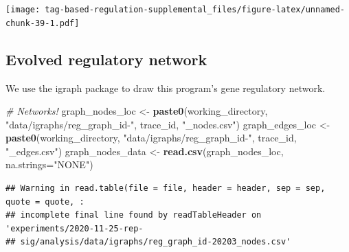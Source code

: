 \documentclass[]{book}
\newenvironment{Shaded}{\begin{snugshade}}{\end{snugshade}}
\newcommand{\CommentTok}[1]{\textcolor[rgb]{0.56,0.35,0.01}{\textit{#1}}}
\newcommand{\DataTypeTok}[1]{\textcolor[rgb]{0.13,0.29,0.53}{#1}}
\newcommand{\KeywordTok}[1]{\textcolor[rgb]{0.13,0.29,0.53}{\textbf{#1}}}
\newcommand{\NormalTok}[1]{#1}
\newcommand{\StringTok}[1]{\textcolor[rgb]{0.31,0.60,0.02}{#1}}
\begin{document}
\texttt{[image: tag-based-regulation-supplemental\_files/figure-latex/unnamed-chunk-39-1.pdf]}

\hypertarget{evolved-regulatory-network}{%
\subsection{Evolved regulatory network}\label{evolved-regulatory-network}}

We use the igraph package to draw this program's gene regulatory network.

\begin{Shaded}
\begin{Highlighting}[]
\CommentTok{# Networks!}
\NormalTok{graph_nodes_loc <-}\StringTok{ }\KeywordTok{paste0}\NormalTok{(working_directory, }\StringTok{"data/igraphs/reg_graph_id-"}\NormalTok{, trace_id, }\StringTok{"_nodes.csv"}\NormalTok{)}
\NormalTok{graph_edges_loc <-}\StringTok{ }\KeywordTok{paste0}\NormalTok{(working_directory, }\StringTok{"data/igraphs/reg_graph_id-"}\NormalTok{, trace_id, }\StringTok{"_edges.csv"}\NormalTok{)}
\NormalTok{graph_nodes_data <-}\StringTok{ }\KeywordTok{read.csv}\NormalTok{(graph_nodes_loc, }\DataTypeTok{na.strings=}\StringTok{"NONE"}\NormalTok{)}
\end{Highlighting}
\end{Shaded}

\begin{verbatim}
## Warning in read.table(file = file, header = header, sep = sep, quote = quote, :
## incomplete final line found by readTableHeader on 'experiments/2020-11-25-rep-
## sig/analysis/data/igraphs/reg_graph_id-20203_nodes.csv'
\end{verbatim}
\end{document}
